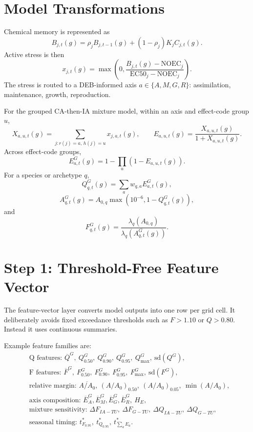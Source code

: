 \documentclass[11pt]{article}
\begin{document}
\section{Model Transformations}
Chemical memory is represented as
\begin{equation}
B_{j,t}(g)=\rho_j B_{j,t-1}(g)+(1-\rho_j)K_jC_{j,t}(g).
\end{equation}
Active stress is then
\begin{equation}
x_{j,t}(g)=\max\left(0,\frac{B_{j,t}(g)-\mathrm{NOEC}_j}{\mathrm{EC50}_j-\mathrm{NOEC}_j}\right).
\end{equation}
The stress is routed to a DEB-informed axis $a\in\{A,M,G,R\}$: assimilation, maintenance, growth, reproduction.

For the grouped CA-then-IA mixture model, within an axis and effect-code group $u$,
\begin{equation}
X_{a,u,t}(g)=\sum_{j:r(j)=a,\,h(j)=u}x_{j,a,t}(g),\qquad
E_{a,u,t}(g)=\frac{X_{a,u,t}(g)}{1+X_{a,u,t}(g)}.
\end{equation}
Across effect-code groups,
\begin{equation}
E_{a,t}^{G}(g)=1-\prod_u\left(1-E_{a,u,t}(g)\right).
\end{equation}
For a species or archetype $q$,
\begin{equation}
Q_{q,t}^{G}(g)=\sum_a w_{q,a}E_{a,t}^{G}(g),
\end{equation}
\begin{equation}
A_{q,t}^{G}(g)=A_{0,q}\max(10^{-6},1-Q_{q,t}^{G}(g)),
\end{equation}
and
\begin{equation}
F_{q,t}^{G}(g)=\frac{\lambda_q(A_{0,q})}{\lambda_q(A_{q,t}^{G}(g))}.
\end{equation}

\section{Step 1: Threshold-Free Feature Vector}
The feature-vector layer converts model outputs into one row per grid cell. It deliberately avoids fixed exceedance thresholds such as $F>1.10$ or $Q>0.80$. Instead it uses continuous summaries.

Example feature families are:
\begin{align}
&\text{Q features: } \overline{Q}^{G},\ Q_{0.50}^{G},\ Q_{0.90}^{G},\ Q_{0.95}^{G},\ Q_{\max}^{G},\ \mathrm{sd}(Q^G),\\
&\text{F features: } \overline{F}^{G},\ F_{0.50}^{G},\ F_{0.90}^{G},\ F_{0.95}^{G},\ F_{\max}^{G},\ \mathrm{sd}(F^G),\\
&\text{relative margin: } \overline{A/A_0},\ (A/A_0)_{0.50},\ (A/A_0)_{0.05},\ \min(A/A_0),\\
&\text{axis composition: } \overline{E}_A^G,\overline{E}_M^G,\overline{E}_G^G,\overline{E}_R^G,\ H_E,\\
&\text{mixture sensitivity: } \Delta F_{IA-TU},\ \Delta F_{G-TU},\ \Delta Q_{IA-TU},\ \Delta Q_{G-TU},\\
&\text{seasonal timing: } t^*_{F_{0.95}},\ t^*_{Q_{0.95}},\ t^*_{\sum_a E_a}.
\end{align}
\end{document}

